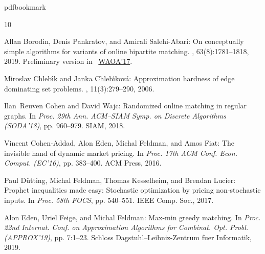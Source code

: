 \newcommand{\prelim}{Preliminary version in\ }\newcommand{\prelims}{Preliminary
  versions in\ }
\providecommand{\bibhead}[1]{}
\expandafter\ifx\csname pdfbookmark\endcsname\relax%
  \providecommand{\tocrefpdfbookmark}{}
\else\providecommand{\tocrefpdfbookmark}{%
   \hypertarget{tocreferences}{}%
   \pdfbookmark[1]{References}{tocreferences}}%
\fi

\tocrefpdfbookmark
\begin{thebibliography}{10}

\bibhead{Bor2017}
{\sc Allan Borodin, Denis Pankratov, and Amirali Salehi{-}Abari}: On
  conceptually simple algorithms for variants of online bipartite matching.
, 63(8):1781--1818, 2019.
\newblock \prelim
  \href{https://doi.org/10.1007/978-3-319-89441-6\_19}{WAOA'17}.
\newblock [\epfmtdoi{10.1007/s00224-019-09916-0}]

\bibhead{ChlebikC06}
{\sc Miroslav Chleb{\'{\i}}k and Janka Chleb{\'{\i}}kov{\'{a}}}: Approximation
  hardness of edge dominating set problems.
, 11(3):279--290, 2006.
\newblock [\epfmtdoi{10.1007/s10878-006-7908-0}]

\bibhead{CohenW18}
{\sc Ilan~Reuven Cohen and David Wajc}: Randomized online matching in regular
  graphs.
\newblock In {\em Proc. 29th Ann. ACM--SIAM Symp. on Discrete Algorithms
  (SODA'18)}, pp. 960--979. SIAM, 2018.
\newblock [\epfmtdoi{10.1137/1.9781611975031.62}]

\bibhead{Cohen-AddadEFF16}
{\sc Vincent Cohen{-}Addad, Alon Eden, Michal Feldman, and Amos Fiat}: The
  invisible hand of dynamic market pricing.
\newblock In {\em Proc. 17th ACM Conf. Econ. Comput. (EC'16)}, pp. 383--400.
  ACM Press, 2016.
\newblock [\epfmtdoi{10.1145/2940716.2940730}]

\bibhead{DuttingFKL16}
{\sc Paul D{\"{u}}tting, Michal Feldman, Thomas Kesselheim, and Brendan
  Lucier}: Prophet inequalities made easy: {S}tochastic optimization by pricing
  non-stochastic inputs.
\newblock In {\em Proc. 58th FOCS}, pp. 540--551. IEEE Comp. Soc., 2017.

\bibhead{conf-version}
{\sc Alon Eden, Uriel Feige, and Michal Feldman}: Max-min greedy matching.
\newblock In {\em Proc. 22nd Internat. Conf. on Approximation Algorithms for
  Combinat. Opt. Probl. (APPROX'19)}, pp. 7:1--23. Schloss
  Dagstuhl--Leibniz-Zentrum fuer Informatik, 2019.


\end{thebibliography}
